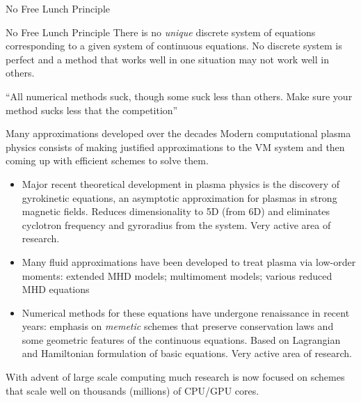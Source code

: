 \documentclass[aspectratio=43]{beamer}
\newcommand{\mypause}{\pause}
\begin{document}
\begin{frame}{No Free Lunch Principle}

  \begin{block}{No Free Lunch Principle}
    There is no \emph{unique} discrete system of equations
    corresponding to a given system of continuous equations. No
    discrete system is perfect and a method that works well in one
    situation may not work well in others.
  \end{block}

  \mypause%
  ``All numerical methods suck, though some suck less than
  others. Make sure your method sucks less that the competition''

\end{frame}

\begin{frame}{Many approximations developed over the decades}
  \small%
  Modern computational plasma physics consists of making justified
  approximations to the VM system and then coming up with efficient
  schemes to solve them.
  \mypause%
  \begin{itemize}
  \item Major recent theoretical development in plasma physics is the
    discovery of gyrokinetic equations, an asymptotic approximation
    for plasmas in strong magnetic fields. Reduces dimensionality to
    5D (from 6D) and eliminates cyclotron frequency and gyroradius
    from the system. Very active area of research.
\mypause%
  \item Many fluid approximations have been developed to treat plasma
    via low-order moments: extended MHD models; multimoment models;
    various reduced MHD equations
    \mypause%
  \item Numerical methods for these equations have undergone
    renaissance in recent years: emphasis on \emph{memetic} schemes
    that preserve conservation laws and some geometric features of the
    continuous equations. Based on Lagrangian and Hamiltonian
    formulation of basic equations. Very active area of research.
  \end{itemize}
  With advent of large scale computing much research is now focused on
  schemes that scale well on thousands (millions) of CPU/GPU cores.
\end{frame}
\end{document}

